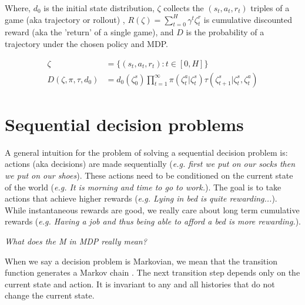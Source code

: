 Where, $d_0$ is the initial state distribution, $\zeta$ collects the $(s_t, a_t, r_t)$ triples of a game (aka trajectory or rollout) \footnotemark[17],
$R(\zeta) =\sum_{t=0}^H \gamma^t \zeta^r_t$ is cumulative discounted reward (aka the 'return' of a single game), and $D$ is the probability of a trajectory under the chosen policy and MDP.


\begin{align}
\zeta &= \{(s_t, a_t, r_t) : t \in [0, H]\} \tag{trajectory} \\
D(\zeta, \pi, \tau, d_0) &= d_0(\zeta^s_0) \prod_{t=1}^{\infty} \pi(\zeta^a_t|\zeta^s_t) \tau(\zeta^s_{t+1}|\zeta^s_t, \zeta^a_t) \tag{p($\zeta$)}
\end{align}


\section{Sequential decision problems}

A general intuition for the problem of solving a sequential decision problem is: actions (aka decisions) are made
sequentially (\textit{e.g. first we put on our socks then we put on our shoes}).
These actions need to be conditioned on the current state of the world (\textit{e.g. It is morning and time to go to work.}).
The goal is to take actions that achieve higher rewards (\textit{e.g. Lying in bed is quite rewarding...}). While instantaneous
rewards are good, we really care about long term cumulative rewards (\textit{e.g. Having a job and thus being able to afford a bed is more rewarding.}).


\begin{displayquote}
  \textsl{What does the M in MDP really mean?}
\end{displayquote}

When we say a decision problem is Markovian, we mean that the transition
function generates a Markov chain \cite{Markov2006}. The next transition step depends only
on the current state and action. It is invariant to any and all histories that do not
change the current state. \footnotemark[18]

